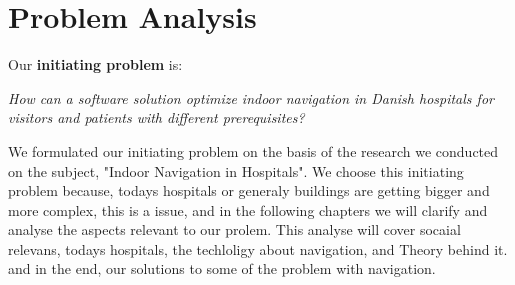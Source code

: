 \chapter{Problem Analysis} \label{cha:problem_analysis}

Our \textbf{initiating problem} is:

\begin{displayquote}
    \textit{How can a software solution optimize indoor navigation in Danish hospitals for visitors and patients with different prerequisites?}\label{sub:init}
\end{displayquote}

We formulated our initiating problem on the basis of the research we conducted on the subject, "Indoor Navigation in Hospitals". We choose this initiating problem because, todays hospitals or generaly buildings are getting bigger and more complex, this is a issue, and in the following chapters we will clarify and analyse the aspects relevant to our prolem. This analyse will cover socaial relevans, todays hospitals, the techloligy about navigation, and Theory behind it. and in the end, our solutions to some of the problem with navigation.  










